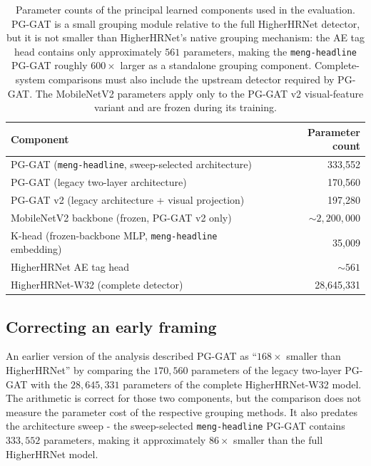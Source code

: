 \begin{table}[H]
\centering
\caption[Parameter counts of the principal learned components used in the evaluation.]{Parameter counts of the principal learned components used in
the evaluation. PG-GAT is a small grouping module relative to the full
HigherHRNet detector, but it is not smaller than HigherHRNet's native
grouping mechanism: the AE tag head contains only approximately
$561$ parameters, making the \texttt{meng-headline} PG-GAT roughly
$600\times$ larger as a standalone grouping component. Complete-system
comparisons must also include the upstream detector required by PG-GAT.
The MobileNetV2 parameters apply only to the PG-GAT v2 visual-feature
variant and are frozen during its training.}
\label{tab:model_size_accounting}
\tablesize
\begin{tabular}{lr}
\toprule
Component & Parameter count \\
\midrule
PG-GAT (\texttt{meng-headline}, sweep-selected architecture)
    & 333{,}552 \\
PG-GAT (legacy two-layer architecture)
    & 170{,}560 \\
PG-GAT v2 (legacy architecture + visual projection)
    & 197{,}280 \\
MobileNetV2 backbone (frozen, PG-GAT v2 only)
    & $\sim 2{,}200{,}000$ \\
K-head (frozen-backbone MLP, \texttt{meng-headline} embedding)
    & 35{,}009 \\
\midrule
HigherHRNet AE tag head
    & $\sim 561$ \\
HigherHRNet-W32 (complete detector)
    & 28{,}645{,}331 \\
\bottomrule
\end{tabular}
\end{table}

\subsection{Correcting an early framing}
\label{sec_res_model_size_correction}

An earlier version of the analysis described PG-GAT as
``$168\times$ smaller than HigherHRNet'' by comparing the
$170{,}560$ parameters of the legacy two-layer PG-GAT with the
$28{,}645{,}331$ parameters of the complete HigherHRNet-W32 model.
The arithmetic is correct for those two components,
but the comparison does not measure the parameter cost of the respective
grouping methods.
It also predates the architecture sweep -
the sweep-selected \texttt{meng-headline} PG-GAT contains $333{,}552$
parameters,
making it approximately $86\times$ smaller than the full HigherHRNet
model.

